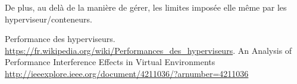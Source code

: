 \documentclass[french]{article}
\begin{document}
De plus, au delà de la manière de gérer, les limites imposée elle même par les hyperviseur/conteneurs. 
\newpage
\begin{thebibliography}{9}

          Performance des hyperviseurs.
          \url{https://fr.wikipedia.org/wiki/Performances_des_hyperviseurs}.
          An Analysis of Performance Interference Effects in Virtual Environments
          \url{http://ieeexplore.ieee.org/document/4211036/?arnumber=4211036}
               
\end{thebibliography}
\end{document}
